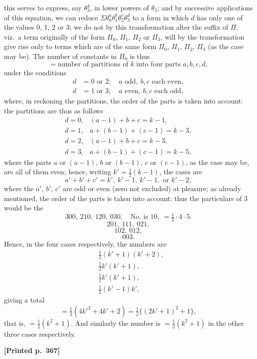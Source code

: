 \documentclass[11pt]{article}
\begin{document}
this serves to express, say $\theta_{3}^{4}$, in lower powers of $\theta_{3}$; and by successive applications of this equation, we can reduce $\Sigma\theta_{0}^{a}\theta_{1}^{b}\theta_{2}^{c}\theta_{3}^{d}$ to a form in which $d$ has only one of the values 0, 1, 2 or 3; we do not by this transformation alter the suffix of $\Pi$, viz.\ a term originally of the form $\Pi_{0}$, $\Pi_{1}$, $\Pi_{2}$ or $\Pi_{3}$, will by the transformation give rise only to terms which are of the same form $\Pi_{0}$, $\Pi_{1}$, $\Pi_{2}$, $\Pi_{3}$ (as the case may be). The number of constants in $\Pi_{0}$ is thus
\[
=\text{number of partitions of }k\text{ into four parts }a,b,c,d,
\]
under the conditions
\begin{align*}
d &= 0\text{ or }2;\quad a\text{ odd},\ b,c\text{ each even},\\
d &= 1\text{ or }3;\quad a\text{ even},\ b,c\text{ each odd},
\end{align*}
where, in reckoning the partitions, the order of the parts is taken into account: the partitions are thus as follows
\[
\begin{array}{ll}
d=0, & (a-1)+b+c=k-1,\\
d=1, & a+(b-1)+(c-1)=k-3,\\
d=2, & (a-1)+b+c=k-3,\\
d=3, & a+(b-1)+(c-1)=k-5,
\end{array}
\]
where the parts $a$ or $(a-1)$, $b$ or $(b-1)$, $c$ or $(c-1)$, as the case may be, are all of them even; hence, writing $k'=\tfrac{1}{2}(k-1)$, the cases are
\[
a'+b'+c'=k',\ k'-1,\ k'-1,\text{ or }k'-2,
\]
where the $a'$, $b'$, $c'$ are odd or even (zero not excluded) at pleasure; as already mentioned, the order of the parts is taken into account: thus the particulars of 3 would be the
\[
300,\ 210,\ 120,\ 030,\quad\text{No.\ is }10,\ =\tfrac{1}{2}\cdot 4\cdot 5.
\]
\[
201,\ 111,\ 021,
\]
\[
102,\ 012,
\]
\[
003.
\]
Hence, in the four cases respectively, the numbers are
\begin{align*}
&\tfrac{1}{2}(k'+1)(k'+2),\\
&\tfrac{1}{2}k'(k'+1),\\
&\tfrac{1}{2}k'(k'+1),\\
&\tfrac{1}{2}(k'-1)k',
\end{align*}
giving a total
\[
=\tfrac{1}{2}(4k'^{2}+4k'+2)=\tfrac{1}{2}\{(2k'+1)^{2}+1\},
\]
that is, $=\tfrac{1}{2}(k^{2}+1)$. And similarly the number is $=\tfrac{1}{2}(k^{2}+1)$ in the other three cases respectively.

\medskip
\noindent\textbf{[Printed p.~367]}\hfill
\end{document}

